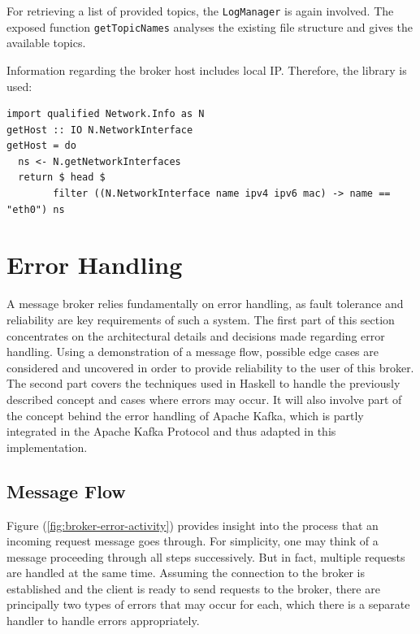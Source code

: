 For retrieving a list of provided topics, the \lstinline{LogManager} is again
involved. The exposed function \lstinline{getTopicNames} analyses the existing
file structure and gives the available topics.

Information regarding the broker host includes local IP. Therefore, the library
 is used: 

\begin{lstlisting}[caption={Get broker's host adress}]
import qualified Network.Info as N
getHost :: IO N.NetworkInterface
getHost = do
  ns <- N.getNetworkInterfaces
  return $ head $ 
        filter ((N.NetworkInterface name ipv4 ipv6 mac) -> name == "eth0") ns
\end{lstlisting}

\newpage
\section{Error Handling}
\label{sec:broker-error-handling}

A message broker relies fundamentally on error handling, as fault tolerance and reliability are key requirements of such a system. The first part of this section concentrates on the architectural details
and decisions made regarding error handling. Using a demonstration of
a message flow, possible edge cases are considered and uncovered
in order to provide reliability to the user of this broker. The second part
covers the techniques used in Haskell to handle the previously described
concept and cases where errors may occur. It will also involve part of the
concept behind the error handling of Apache Kafka, which is partly integrated
in the Apache Kafka Protocol and thus adapted in this implementation.

\subsection{Message Flow}

Figure (\ref{fig:broker-error-activity}) provides insight into the process that an
incoming request message goes through. For simplicity, one may think of a
message proceeding through all steps successively. But in fact,
multiple requests are handled at the same time. Assuming the connection to the
broker is established and the client is ready to send requests to the broker,
there are principally two types of errors that may occur for each, which there
is a separate handler to handle errors appropriately.

